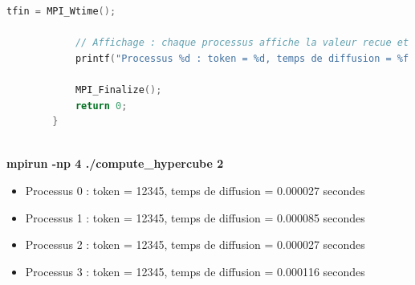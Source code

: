 \documentclass[a4paper,13pt]{book}
\begin{document}
\begin{lstlisting}[language=C]
            tfin = MPI_Wtime();
        
            // Affichage : chaque processus affiche la valeur recue et le temps de diffusion.
            printf("Processus %d : token = %d, temps de diffusion = %f secondes\n", rank, token, tfin - tdeb);
        
            MPI_Finalize();
            return 0;
        }
        
\end{lstlisting}
\textbf{mpirun -np 4 ./compute\_hypercube 2}
\begin{itemize}
\item Processus 0 : token = 12345, temps de diffusion = 0.000027 secondes
\item Processus 1 : token = 12345, temps de diffusion = 0.000085 secondes
\item Processus 2 : token = 12345, temps de diffusion = 0.000027 secondes
\item Processus 3 : token = 12345, temps de diffusion = 0.000116 secondes
\end{itemize}
\end{document}
